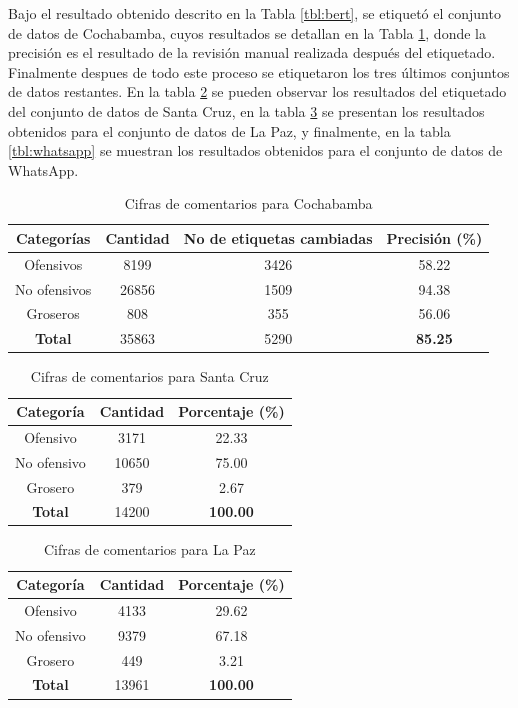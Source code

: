 Bajo el resultado obtenido descrito en la Tabla \ref{tbl:bert}, se etiquetó el conjunto de datos de Cochabamba, cuyos resultados se detallan en la Tabla \ref{tbl:cochabamba}, donde la precisión es el resultado de la revisión manual realizada después del etiquetado. Finalmente despues de todo este proceso se etiquetaron los tres últimos conjuntos de datos restantes. En la tabla \ref{tbl:santacruz} se pueden observar los resultados del etiquetado del conjunto de datos de Santa Cruz, en la tabla \ref{tbl:lapaz} se presentan los resultados obtenidos para el conjunto de datos de La Paz, y finalmente, en la tabla \ref{tbl:whatsapp} se muestran los resultados obtenidos para el conjunto de datos de WhatsApp.


\begin{table}[!ht]
	\centering
	\begin{tabular}{|c|c|c|c|}
		\hline
		\textbf{Categorías} & \textbf{Cantidad} & \textbf{No de etiquetas cambiadas} & \textbf{Precisión (\%)} \\ \hline
		Ofensivos & 8199 & 3426 & 58.22 \\ 
		No ofensivos & 26856 & 1509 & 94.38 \\ 
		Groseros & 808 & 355 & 56.06 \\ \hline
		\textbf{Total} & 35863 & 5290 & \textbf{85.25} \\ \hline
	\end{tabular}
	\caption{Cifras de comentarios para Cochabamba}
	\label{tbl:cochabamba}
\end{table}

\begin{table}[!ht]
	\centering
	\begin{tabular}{|c|c|c|}
		\hline
		\textbf{Categoría} & \textbf{Cantidad} & \textbf{Porcentaje (\%)} \\ \hline
		Ofensivo & 3171 & 22.33 \\ 
		No ofensivo & 10650 & 75.00 \\ 
		Grosero & 379 & 2.67 \\ \hline
		\textbf{Total} & 14200 & \textbf{100.00} \\ \hline
	\end{tabular}
	\caption{Cifras de comentarios para Santa Cruz}
	\label{tbl:santacruz}
\end{table}


\begin{table}[!ht]
	\centering
	\begin{tabular}{|c|c|c|}
		\hline
		\textbf{Categoría} & \textbf{Cantidad} & \textbf{Porcentaje (\%)} \\ \hline
		Ofensivo & 4133 & 29.62 \\ 
		No ofensivo & 9379 & 67.18 \\ 
		Grosero & 449 & 3.21 \\ \hline
		\textbf{Total} & 13961 & \textbf{100.00} \\ \hline
	\end{tabular}
	\caption{Cifras de comentarios para La Paz}
	\label{tbl:lapaz}
\end{table}

